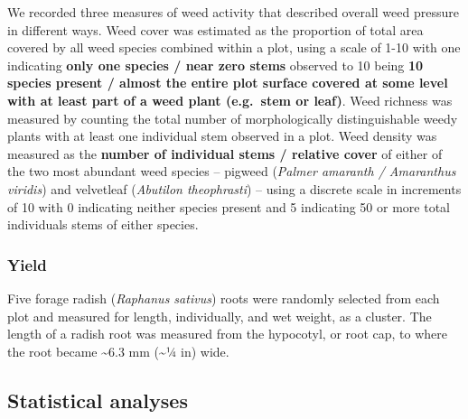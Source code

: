 \documentclass[
]{article}
\begin{document}
We recorded three measures of weed activity that described overall weed pressure in different ways.
Weed cover was estimated as the proportion of total area covered by all weed species combined within a plot, using a scale of 1-10 with one indicating \textbf{only one species / near zero stems} observed to 10 being \textbf{10 species present / almost the entire plot surface covered at some level with at least part of a weed plant (e.g.~stem or leaf)}.
Weed richness was measured by counting the total number of morphologically distinguishable weedy plants with at least one individual stem observed in a plot.
Weed density was measured as the \textbf{number of individual stems / relative cover} of either of the two most abundant weed species -- pigweed (\emph{Palmer amaranth / Amaranthus viridis}) and velvetleaf (\emph{Abutilon theophrasti}) -- using a discrete scale in increments of 10 with 0 indicating neither species present and 5 indicating 50 or more total individuals stems of either species.

\hypertarget{yield}{%
\subsubsection{Yield}\label{yield}}

Five forage radish (\emph{Raphanus sativus}) roots were randomly selected from each plot and measured for length, individually, and wet weight, as a cluster.
The length of a radish root was measured from the hypocotyl, or root cap, to where the root became \textasciitilde6.3 mm (\textasciitilde1⁄4 in) wide.

\hypertarget{statistical-analyses}{%
\subsection{Statistical analyses}\label{statistical-analyses}}
\end{document}
